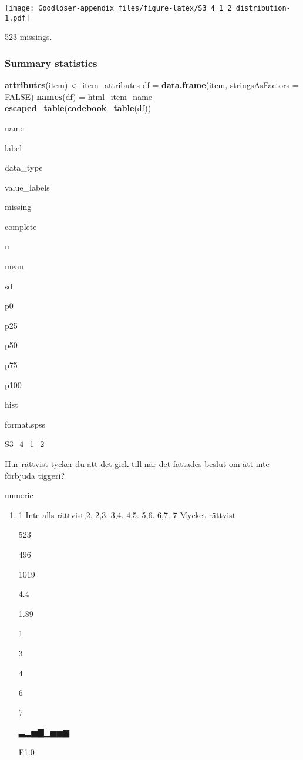 \documentclass[]{book}
\newenvironment{Shaded}{\begin{snugshade}}{\end{snugshade}}
\newcommand{\KeywordTok}[1]{\textcolor[rgb]{0.13,0.29,0.53}{\textbf{#1}}}
\newcommand{\DataTypeTok}[1]{\textcolor[rgb]{0.13,0.29,0.53}{#1}}
\newcommand{\StringTok}[1]{\textcolor[rgb]{0.31,0.60,0.02}{#1}}
\newcommand{\OtherTok}[1]{\textcolor[rgb]{0.56,0.35,0.01}{#1}}
\newcommand{\OperatorTok}[1]{\textcolor[rgb]{0.81,0.36,0.00}{\textbf{#1}}}
\newcommand{\NormalTok}[1]{#1}
\providecommand{\tightlist}{%
  \setlength{\itemsep}{0pt}\setlength{\parskip}{0pt}}
\begin{document}
\texttt{[image: Goodloser-appendix\_files/figure-latex/S3\_4\_1\_2\_distribution-1.pdf]}

\begin{Shaded}
\end{Shaded}

523 missings.

\subsubsection{Summary statistics}\label{S3_4_1_2_summary}

\begin{Shaded}
\begin{Highlighting}[]
\KeywordTok{attributes}\NormalTok{(item) <-}\StringTok{ }\NormalTok{item_attributes}
\NormalTok{df =}\StringTok{ }\KeywordTok{data.frame}\NormalTok{(item, }\DataTypeTok{stringsAsFactors =} \OtherTok{FALSE}\NormalTok{)}
\KeywordTok{names}\NormalTok{(df) =}\StringTok{ }\NormalTok{html_item_name}
\KeywordTok{escaped_table}\NormalTok{(}\KeywordTok{codebook_table}\NormalTok{(df))}
\end{Highlighting}
\end{Shaded}

name

label

data\_type

value\_labels

missing

complete

n

mean

sd

p0

p25

p50

p75

p100

hist

format.spss

S3\_4\_1\_2

Hur rättvist tycker du att det gick till när det fattades beslut om att
inte förbjuda tiggeri?

numeric

\begin{enumerate}
\def\labelenumi{\arabic{enumi}.}
\tightlist
\item
  1 Inte alls rättvist,2. 2,3. 3,4. 4,5. 5,6. 6,7. 7 Mycket rättvist

  523

  496

  1019

  4.4

  1.89

  1

  3

  4

  6

  7

  ▃▂▅▇▁▅▅▆

  F1.0
\end{enumerate}
\end{document}
